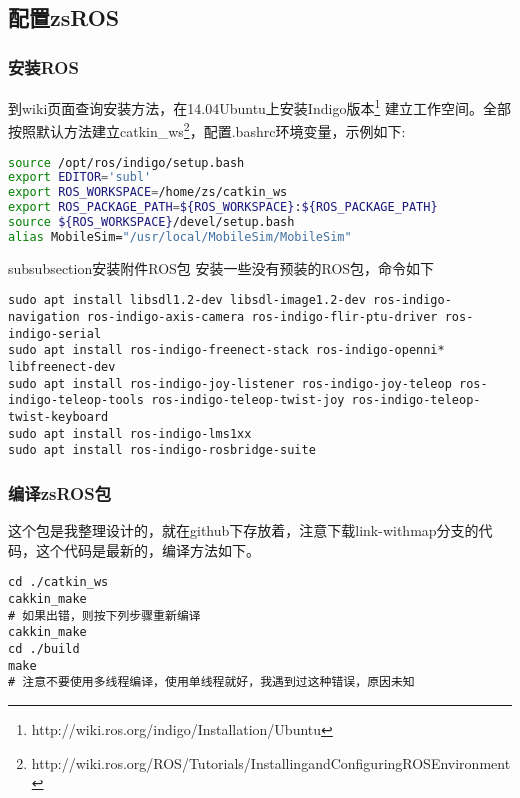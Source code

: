 \documentclass[a4paper,twoside,cs4size,fancyhdr,notitlepage]{ctexart}
\begin{document}
\subsection{配置zsROS}
\subsubsection{安装ROS}
到wiki页面查询安装方法，在14.04Ubuntu上安装Indigo版本\footnote{http://wiki.ros.org/indigo/Installation/Ubuntu}
建立工作空间。全部按照默认方法建立catkin\_ws\footnote{http://wiki.ros.org/ROS/Tutorials/InstallingandConfiguringROSEnvironment}，配置.bashrc环境变量，示例如下:
\begin{lstlisting}[language=bash]
source /opt/ros/indigo/setup.bash
export EDITOR='subl'
export ROS_WORKSPACE=/home/zs/catkin_ws
export ROS_PACKAGE_PATH=${ROS_WORKSPACE}:${ROS_PACKAGE_PATH}
source ${ROS_WORKSPACE}/devel/setup.bash
alias MobileSim="/usr/local/MobileSim/MobileSim"
\end{lstlisting}
subsubsection{安装附件ROS包}
安装一些没有预装的ROS包，命令如下
\begin{lstlisting}
sudo apt install libsdl1.2-dev libsdl-image1.2-dev ros-indigo-navigation ros-indigo-axis-camera ros-indigo-flir-ptu-driver ros-indigo-serial
sudo apt install ros-indigo-freenect-stack ros-indigo-openni* libfreenect-dev
sudo apt install ros-indigo-joy-listener ros-indigo-joy-teleop ros-indigo-teleop-tools ros-indigo-teleop-twist-joy ros-indigo-teleop-twist-keyboard
sudo apt install ros-indigo-lms1xx
sudo apt install ros-indigo-rosbridge-suite
\end{lstlisting}
\subsubsection{编译zsROS包}
这个包是我整理设计的，就在github下存放着，注意下载link-withmap分支的代码，这个代码是最新的，编译方法如下。
\begin{lstlisting}
cd ./catkin_ws
cakkin_make
# 如果出错，则按下列步骤重新编译
cakkin_make
cd ./build
make
# 注意不要使用多线程编译，使用单线程就好，我遇到过这种错误，原因未知
\end{lstlisting}
\end{document}
